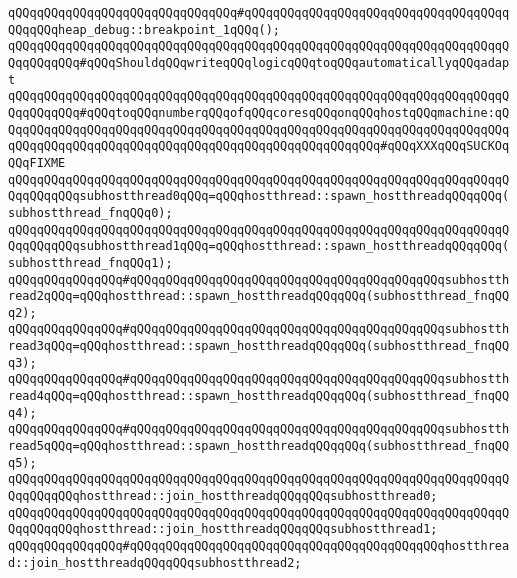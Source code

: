 \verb|qQQqqQQqqQQqqQQqqQQqqQQqqQQqqQQq#qQQqqQQqqQQqqQQqqQQqqQQqqQQqqQQqqQQqqQQqqQQqheap_debug::breakpoint_1qQQq();|\newline
\newline
\verb|qQQqqQQqqQQqqQQqqQQqqQQqqQQqqQQqqQQqqQQqqQQqqQQqqQQqqQQqqQQqqQQqqQQqqQQqqQQqqQQq#qQQqShouldqQQqwriteqQQqlogicqQQqtoqQQqautomaticallyqQQqadapt|\newline
\verb|qQQqqQQqqQQqqQQqqQQqqQQqqQQqqQQqqQQqqQQqqQQqqQQqqQQqqQQqqQQqqQQqqQQqqQQqqQQqqQQq#qQQqtoqQQqnumberqQQqofqQQqcoresqQQqonqQQqhostqQQqmachine:qQQqqQQqqQQqqQQqqQQqqQQqqQQqqQQqqQQqqQQqqQQqqQQqqQQqqQQqqQQqqQQqqQQqqQQqqQQqqQQqqQQqqQQqqQQqqQQqqQQqqQQqqQQqqQQqqQQqqQQqqQQq#qQQqXXXqQQqSUCKOqQQqFIXME|\newline
\newline
\verb|qQQqqQQqqQQqqQQqqQQqqQQqqQQqqQQqqQQqqQQqqQQqqQQqqQQqqQQqqQQqqQQqqQQqqQQqqQQqqQQqsubhostthread0qQQq=qQQqhostthread::spawn_hostthreadqQQqqQQq(subhostthread_fnqQQq0);|\newline
\verb|qQQqqQQqqQQqqQQqqQQqqQQqqQQqqQQqqQQqqQQqqQQqqQQqqQQqqQQqqQQqqQQqqQQqqQQqqQQqqQQqsubhostthread1qQQq=qQQqhostthread::spawn_hostthreadqQQqqQQq(subhostthread_fnqQQq1);|\newline
\verb|qQQqqQQqqQQqqQQq#qQQqqQQqqQQqqQQqqQQqqQQqqQQqqQQqqQQqqQQqqQQqsubhostthread2qQQq=qQQqhostthread::spawn_hostthreadqQQqqQQq(subhostthread_fnqQQq2);|\newline
\verb|qQQqqQQqqQQqqQQq#qQQqqQQqqQQqqQQqqQQqqQQqqQQqqQQqqQQqqQQqqQQqsubhostthread3qQQq=qQQqhostthread::spawn_hostthreadqQQqqQQq(subhostthread_fnqQQq3);|\newline
\verb|qQQqqQQqqQQqqQQq#qQQqqQQqqQQqqQQqqQQqqQQqqQQqqQQqqQQqqQQqqQQqsubhostthread4qQQq=qQQqhostthread::spawn_hostthreadqQQqqQQq(subhostthread_fnqQQq4);|\newline
\verb|qQQqqQQqqQQqqQQq#qQQqqQQqqQQqqQQqqQQqqQQqqQQqqQQqqQQqqQQqqQQqsubhostthread5qQQq=qQQqhostthread::spawn_hostthreadqQQqqQQq(subhostthread_fnqQQq5);|\newline
\newline
\verb|qQQqqQQqqQQqqQQqqQQqqQQqqQQqqQQqqQQqqQQqqQQqqQQqqQQqqQQqqQQqqQQqqQQqqQQqqQQqqQQqhostthread::join_hostthreadqQQqqQQqsubhostthread0;|\newline
\verb|qQQqqQQqqQQqqQQqqQQqqQQqqQQqqQQqqQQqqQQqqQQqqQQqqQQqqQQqqQQqqQQqqQQqqQQqqQQqqQQqhostthread::join_hostthreadqQQqqQQqsubhostthread1;|\newline
\verb|qQQqqQQqqQQqqQQq#qQQqqQQqqQQqqQQqqQQqqQQqqQQqqQQqqQQqqQQqqQQqhostthread::join_hostthreadqQQqqQQqsubhostthread2;|\newline
